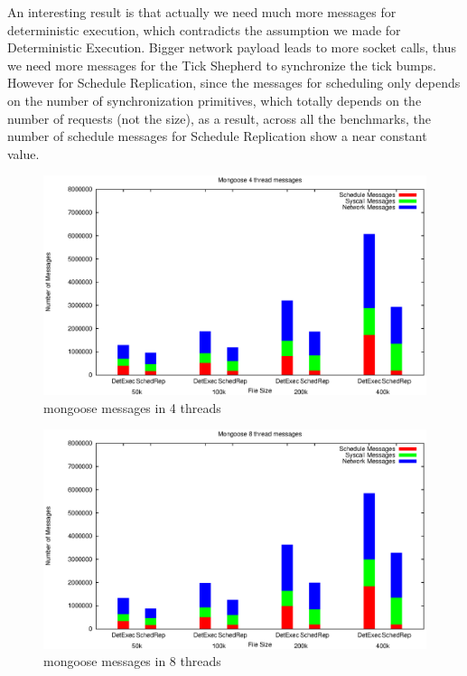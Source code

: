 
An interesting result is that actually we need much more messages for deterministic execution, which contradicts the assumption we made for Deterministic Execution. Bigger network payload leads to more socket calls, thus we need more messages for the Tick Shepherd to synchronize the tick bumps. However for Schedule Replication, since the messages for scheduling only depends on the number of synchronization primitives, which totally depends on the number of requests (not the size), as a result, across all the benchmarks, the number of schedule messages for Schedule Replication show a near constant value.

\begin{figure}
\centering
\includegraphics[width=1\columnwidth]{figures/mg_msg_4}
\caption{mongoose messages in 4 threads}
\label{f:mg_msg_4}
\end{figure}
\begin{figure}
\centering
\includegraphics[width=1\columnwidth]{figures/mg_msg_8}
\caption{mongoose messages in 8 threads}
\label{f:mg_msg_8}
\end{figure}
